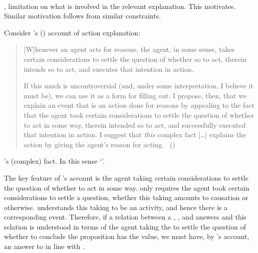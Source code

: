 \paragraph*{}

\begin{note}
  \cExpl{}, limitation on what is involved in the relevant explanation.
  This motivates.
  Similar motivation follows from similar constraints.
\end{note}

\begin{note}
  Consider \citeauthor{Hieronymi:2011aa}'s (\citeyear{Hieronymi:2011aa}) account of action explanation:

  \begin{quote}
    [W]henever an agent acts for reasons, the agent, in some sense, takes certain considerations to settle the question of whether so to act, therein intends so to act, and executes that intention in action.

    If this much is uncontroversial (and, under some interpretation, I believe it must be), we can use it as a form for filling out.
    I propose, then, that we explain an event that is an action done for reasons by appealing to the fact that the agent took certain considerations to settle the question of whether to act in some way, therein intended so to act, and successfully executed that intention in action.
    I suggest that \emph{this} complex fact [\dots] explains the action by giving the agent's reason for acting.%
    \mbox{ }\hfill\mbox{(\citeyear[421]{Hieronymi:2011aa})}
  \end{quote}

  \citeauthor{Hieronymi:2011aa}'s (complex) fact.
  In this sense `\fExpl{}'.
\end{note}

\begin{note}
  The key feature of \citeauthor{Hieronymi:2011aa}'s account is the agent taking certain considerations to settle the question of whether to act in some way.
  \citeauthor{Hieronymi:2011aa} only requires the agent took certain considerations to settle a question, whether this taking amounts to causation or otherwise.
  \citeauthor{Hieronymi:2011aa} understands this taking to be an activity, and hence there is a corresponding event.
  Therefore, if a relation between a , , and \pool{} answers \qWhy{} and this relation is understood in terms of the agent taking the \pool{} to settle the question of whether to conclude the proposition has the value, we must have, by \citeauthor{Hieronymi:2011aa}'s account, an answer to \qHow{} in line with \issueInclusion{}.
\end{note}

